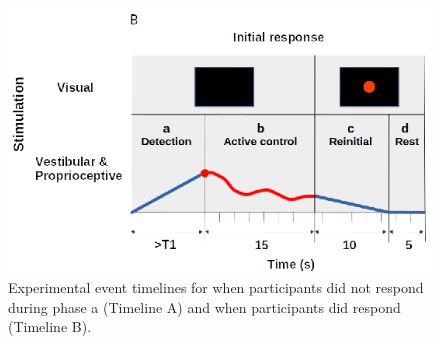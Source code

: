 \documentclass{ieeeaccess}
\begin{document}
\begin{figure}[htp]
\begin{center}
\includegraphics[width=1.0\linewidth]{figures/figure2B.eps}
\end{center}
\caption{Experimental event timelines for when participants did not respond during phase a (Timeline A) and when participants did respond (Timeline B).}
\label{fig2}
\end{figure}
\end{document}
